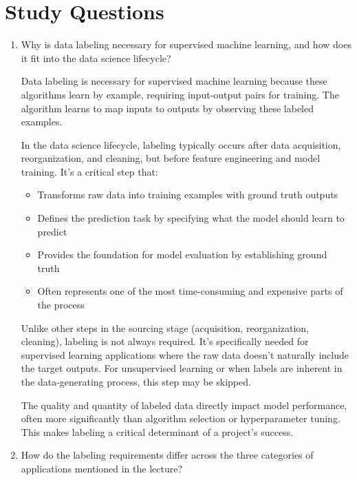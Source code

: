 \documentclass[12pt]{article}
\begin{document}
\section{Study Questions}

\begin{enumerate}
    \item Why is data labeling necessary for supervised machine learning, and how does it fit into the data science lifecycle?
    
    \begin{tcolorbox}[colback=blue!5!white,colframe=blue!75!black,title={Solution}]
    Data labeling is necessary for supervised machine learning because these algorithms learn by example, requiring input-output pairs for training. The algorithm learns to map inputs to outputs by observing these labeled examples.
    
    In the data science lifecycle, labeling typically occurs after data acquisition, reorganization, and cleaning, but before feature engineering and model training. It's a critical step that:
    
    \begin{itemize}
        \item Transforms raw data into training examples with ground truth outputs
        \item Defines the prediction task by specifying what the model should learn to predict
        \item Provides the foundation for model evaluation by establishing ground truth
        \item Often represents one of the most time-consuming and expensive parts of the process
    \end{itemize}
    
    Unlike other steps in the sourcing stage (acquisition, reorganization, cleaning), labeling is not always required. It's specifically needed for supervised learning applications where the raw data doesn't naturally include the target outputs. For unsupervised learning or when labels are inherent in the data-generating process, this step may be skipped.
    
    The quality and quantity of labeled data directly impact model performance, often more significantly than algorithm selection or hyperparameter tuning. This makes labeling a critical determinant of a project's success.
    \end{tcolorbox}
    
    \item How do the labeling requirements differ across the three categories of applications mentioned in the lecture?
    

\end{enumerate}
\end{document}
